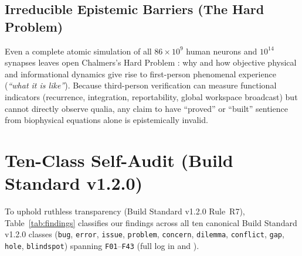 \documentclass[11pt,letterpaper]{amsart}
\begin{document}
\subsection{Irreducible Epistemic Barriers (The Hard Problem)}
Even a complete atomic simulation of all $86\times 10^9$ human neurons and $10^{14}$ synapses leaves open Chalmers's Hard Problem \cite{chalmers1995facing}: why and how objective physical and informational dynamics give rise to first-person phenomenal experience (\emph{``what it is like''}). Because third-person verification can measure functional indicators (recurrence, integration, reportability, global workspace broadcast) but cannot directly observe qualia, any claim to have ``proved'' or ``built'' sentience from biophysical equations alone is epistemically invalid.

\section{Ten-Class Self-Audit (Build Standard v1.2.0)}

To uphold ruthless transparency (Build Standard v1.2.0 Rule~R7), Table~\ref{tab:findings} classifies our findings across all ten canonical Build Standard v1.2.0 classes (\texttt{bug}, \texttt{error}, \texttt{issue}, \texttt{problem}, \texttt{concern}, \texttt{dilemma}, \texttt{conflict}, \texttt{gap}, \texttt{hole}, \texttt{blindspot}) spanning \texttt{F01}--\texttt{F43} (full log in  and ).
\end{document}
